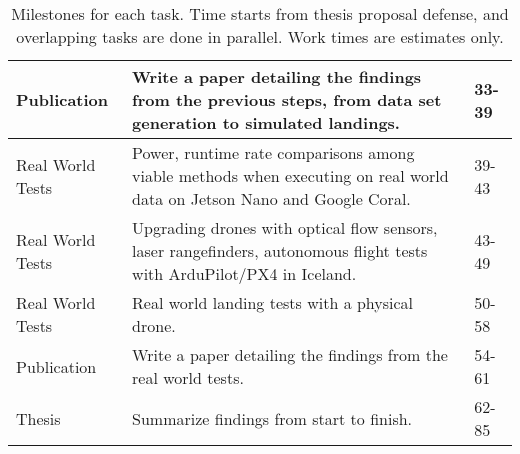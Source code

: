 \begin{table}
\begin{tabular}{|p{2cm}|p{10cm}|p{2cm}|}
        Publication & Write a paper detailing the findings from the previous steps, from data set generation to simulated landings. & 33-39\\\hline
        Real World Tests & Power, runtime rate comparisons among viable methods when executing on real world data on Jetson Nano and Google Coral. & 39-43\\\hline
        Real World Tests & Upgrading drones with optical flow sensors, laser rangefinders, autonomous flight tests with ArduPilot/PX4 in Iceland. & 43-49\\\hline
        Real World Tests & Real world landing tests with a physical drone. & 50-58\\\hline
        Publication & Write a paper detailing the findings from the real world tests. & 54-61\\\hline
        Thesis & Summarize findings from start to finish. & 62-85\\\hline
    \end{tabular}
    \caption{Milestones for each task. Time starts from thesis proposal defense, and overlapping tasks are done in parallel. Work times are estimates only.}
    \label{table:milestones}
\end{table}